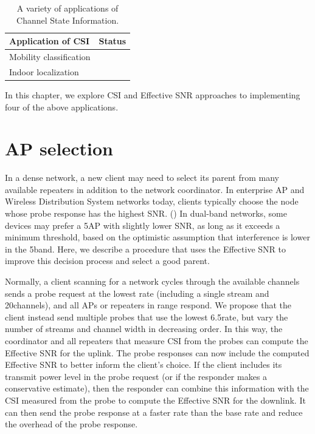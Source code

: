 \begin{table}[htp]
	\centering
	\begin{tabular}{lc}
	\toprule
		\textbf{Application of CSI} & \textbf{Status} \\
	\midrule
		Mobility classification & \secref{sec:esnr_mobility}\\
		Indoor localization \\
	\bottomrule
	\end{tabular}
	\caption[A variety of applications of Channel State Information]{\label{tab:csi_uses}A variety of applications of Channel State Information.}
\end{table}

In this chapter, we explore CSI and Effective SNR approaches to implementing four of the above applications.


\section{AP selection}\label{sec:esnr_apsel}
In a dense network, a new client may need to select its parent from many available repeaters in addition to the network coordinator. In enterprise AP and Wireless Distribution System networks today, clients typically choose the node whose probe response has the highest SNR\@. () In dual-band networks, some devices may prefer a 5\GHz AP with slightly lower SNR, as long as it exceeds a minimum threshold, based on the optimistic assumption that interference is lower in the 5\GHz band. Here, we describe a procedure that uses the Effective SNR to improve this decision process and select a good parent.

Normally, a client scanning for a network cycles through the available channels sends a probe request at the lowest rate (including a single stream and 20\MHz channels), and all APs or repeaters in range respond. We propose that the client instead send multiple probes that use the lowest 6.5\Mbps rate, but vary the number of streams and channel width in decreasing order. In this way, the coordinator and all repeaters that measure CSI from the probes can compute the Effective SNR for the uplink. The probe responses can now include the computed Effective SNR to better inform the client's choice. If the client includes its transmit power level in the probe request (or if the responder makes a conservative estimate), then the responder can combine this information with the CSI measured from the probe to compute the Effective SNR for the downlink. It can then send the probe response at a faster rate than the base rate and reduce the overhead of the probe response.

